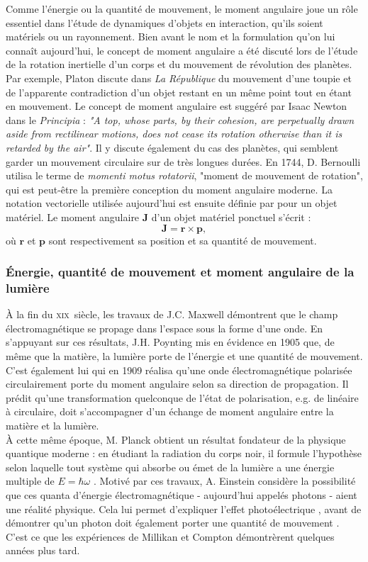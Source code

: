 Comme l'énergie ou la quantité de mouvement, le moment angulaire joue un rôle essentiel dans l'étude de dynamiques d'objets en interaction, qu'ils soient matériels ou un rayonnement. Bien avant le nom et la formulation qu'on lui connaît aujourd'hui, le concept de moment angulaire a été discuté lors de l'étude de la rotation inertielle d'un corps et du mouvement de révolution des planètes. Par exemple, Platon discute dans \textit{La République} du mouvement d'une toupie et de l'apparente contradiction d'un objet restant en un même point tout en étant en mouvement. Le concept de moment angulaire est suggéré par Isaac Newton dans le \textit{Principia} : \textit{"A top, whose parts, by their cohesion, are perpetually drawn aside from rectilinear motions, does not cease its rotation otherwise than it is retarded by the air"}. Il y discute également du cas des planètes, qui semblent garder un mouvement circulaire sur de très longues durées. En 1744, D. Bernoulli utilisa le terme de \textit{momenti motus rotatorii}, "moment de mouvement de rotation", qui est peut-être la première conception du moment angulaire moderne. La notation vectorielle utilisée aujourd'hui est ensuite définie par  pour un objet matériel. Le moment angulaire $\bm{J}$ d'un objet matériel ponctuel s'écrit :
\begin{equation}
\bm{J} = \bm{r}\times\bm{p},
\label{eq:am_matiere}
\end{equation}
où $\bm{r}$ et $\bm{p}$ sont respectivement sa position et sa quantité de mouvement.

\subsubsection{\'Energie, quantité de mouvement et moment angulaire de la lumière}
\`A la fin du \textsc{xix}\ieme ~siècle, les travaux de J.C. Maxwell démontrent que le champ électromagnétique se propage dans l'espace sous la forme d'une onde. En s'appuyant sur ces résultats, J.H. Poynting mis en évidence en 1905 que, de même que la matière, la lumière porte de l'énergie et une quantité de mouvement. C'est également lui qui en 1909 réalisa qu'une onde électromagnétique polarisée circulairement porte du moment angulaire selon sa direction de propagation. Il prédit qu'une transformation quelconque de l'état de polarisation, e.g. de linéaire à circulaire, doit s'accompagner d'un échange de moment angulaire entre la matière et la lumière. \\
\`A cette même époque, M. Planck obtient un résultat fondateur de la physique quantique moderne : en étudiant la radiation du corps noir, il formule l'hypothèse selon laquelle tout système qui absorbe ou émet de la lumière a une énergie multiple de $E = \hbar\omega$ . Motivé par ces travaux, A. Einstein considère la possibilité que ces quanta d'énergie électromagnétique - aujourd'hui appelés photons - aient une réalité physique. Cela lui permet d'expliquer l'effet photoélectrique , avant de démontrer qu'un photon doit également porter une quantité de mouvement . C'est ce que les expériences de Millikan et Compton démontrèrent quelques années plus tard. 

